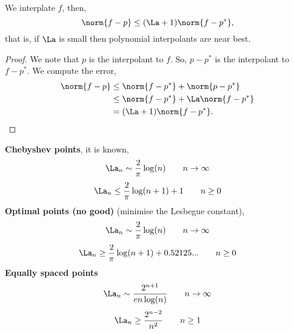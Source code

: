 \begin{nthm}
  We interplate $f$, then,
  $$ \norm{f - p} \le (\La + 1) \norm{f - p^*}, $$
  that is, if $\La$ is small then polynomial interpolants are near best.
\end{nthm}
\begin{proof}
  We note that $p$ is the interpolant to $f$. So, $p - p^*$ is the interpolant to $f - p^*$. We compute the error,
  \begin{align*}
    \norm{f - p} &\le \norm{f - p^*} + \norm{p - p^*} \\
    &\le \norm{f - p^*} + \La \norm{f- p^*} \\
    &= (\La + 1)\norm{f - p^*}.
  \end{align*}
\end{proof}

\begin{nthm}
  \textbf{Chebyshev points}, it is known,
  $$ \La_n \sim \frac{2}{\pi}\log (n) \qquad n \to \infty $$
  $$ \La_n \le \frac{2}{\pi}\log(n+1) + 1 \qquad n \ge 0 $$
  \textbf{Optimal points (no good)} (minimise the Lesbegue constant),
  $$ \La_n \sim \frac{2}{\pi}\log(n) \qquad n \to \infty $$
  $$ \La_n \ge \frac{2}{\pi}\log(n+1) + 0.52125... \qquad n \ge 0  $$
  \textbf{Equally spaced points}
  $$ \La_n \sim \frac{2^{n+1}}{e n \log (n)} \qquad n\to\infty $$
  $$ \La_n \ge \frac{2^{n-2}}{n^2} \qquad n \ge 1 $$
\end{nthm}